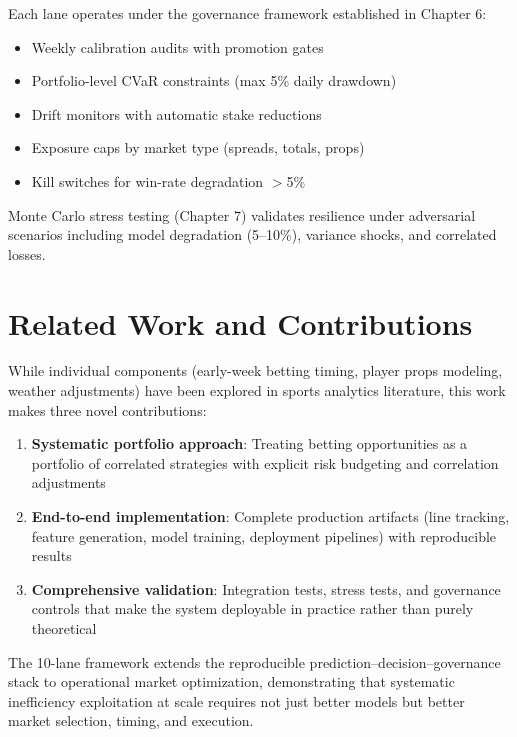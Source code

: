 Each lane operates under the governance framework established in Chapter 6:
\begin{itemize}
  \item Weekly calibration audits with promotion gates
  \item Portfolio-level CVaR constraints (max 5\% daily drawdown)
  \item Drift monitors with automatic stake reductions
  \item Exposure caps by market type (spreads, totals, props)
  \item Kill switches for win-rate degradation $>$5\%
\end{itemize}

Monte Carlo stress testing (Chapter 7) validates resilience under adversarial scenarios including model degradation (5--10\%), variance shocks, and correlated losses.

\section{Related Work and Contributions}

While individual components (early-week betting timing, player props modeling, weather adjustments) have been explored in sports analytics literature, this work makes three novel contributions:

\begin{enumerate}
  \item \textbf{Systematic portfolio approach}: Treating betting opportunities as a portfolio of correlated strategies with explicit risk budgeting and correlation adjustments
  \item \textbf{End-to-end implementation}: Complete production artifacts (line tracking, feature generation, model training, deployment pipelines) with reproducible results
  \item \textbf{Comprehensive validation}: Integration tests, stress tests, and governance controls that make the system deployable in practice rather than purely theoretical
\end{enumerate}

The 10-lane framework extends the reproducible prediction--decision--governance stack to operational market optimization, demonstrating that systematic inefficiency exploitation at scale requires not just better models but better market selection, timing, and execution.

